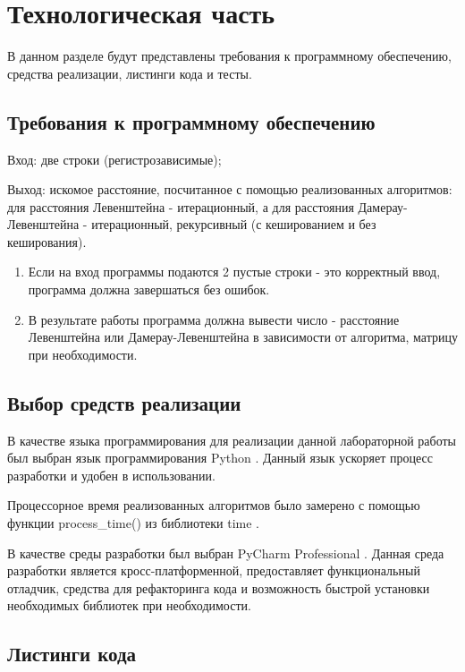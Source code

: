 \chapter{Технологическая часть}

В данном разделе будут представлены требования к программному обеспечению, средства реализации, листинги кода и тесты.

\section{Требования к программному обеспечению}
Вход: две строки (регистрозависимые);

Выход: искомое расстояние, посчитанное с помощью реализованных алгоритмов: для расстояния Левенштейна - итерационный, а для расстояния Дамерау-Левенштейна - итерационный, рекурсивный (с кешированием и без кеширования).

\begin{enumerate}
	\item Если на вход программы подаются 2 пустые строки - это корректный ввод, программа должна завершаться без ошибок.
	\item В результате работы программа должна вывести число - расстояние Левенштейна или Дамерау-Левенштейна в зависимости от алгоритма, матрицу при необходимости.
\end{enumerate}


\section{Выбор средств реализации}

В качестве языка программирования для реализации данной лабораторной работы был выбран язык программирования Python  \cite{PythonBook}. Данный язык ускоряет процесс разработки и удобен в использовании.

Процессорное время реализованных алгоритмов было замерено с помощью функции process\_time() из библиотеки time \cite{process_time_text}.

В качестве среды разработки был выбран PyCharm Professional \cite{pycharm}. Данная среда разработки является кросс-платформенной, предоставляет функциональный отладчик, средства для рефакторинга кода и возможность быстрой установки необходимых библиотек при необходимости.

\section{Листинги кода}

